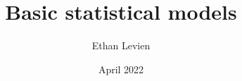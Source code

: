 

\title{\Huge \color{C1} Basic statistical models}
\author{\color{C1} Ethan Levien}
\date{April 2022}



\maketitle

\tableofcontents

%
% 
%  
%  
    




%


